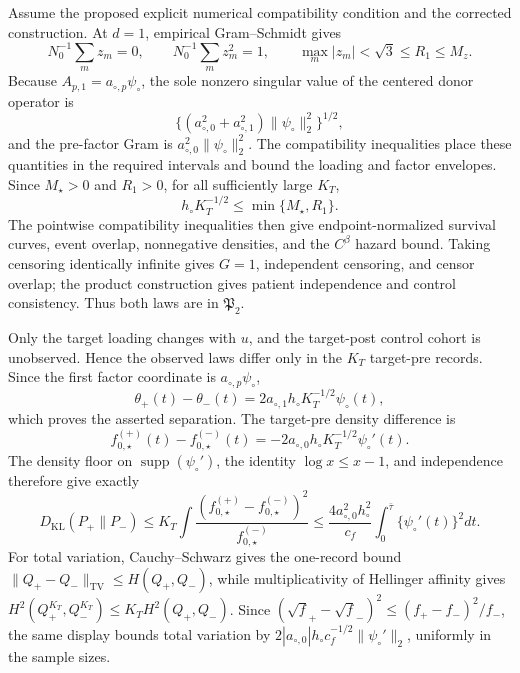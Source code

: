 Assume the proposed explicit numerical compatibility condition and the corrected construction.  At \(d=1\), empirical Gram--Schmidt gives
\[
 N_0^{-1}\sum_mz_m=0,
 \qquad N_0^{-1}\sum_mz_m^2=1,
 \qquad \max_m|z_m|<\sqrt3\le R_1\le M_z.
\]
Because \(A_{p,1}=a_{\circ,p}\psi_\circ\), the sole nonzero singular value of the centered donor operator is
\[
 \{(a_{\circ,0}^2+a_{\circ,1}^2)\|\psi_\circ\|_2^2\}^{1/2},
\]
and the pre-factor Gram is \(a_{\circ,0}^2\|\psi_\circ\|_2^2\).  The compatibility inequalities place these quantities in the required intervals and bound the loading and factor envelopes.  Since \(M_\star>0\) and \(R_1>0\), for all sufficiently large \(K_T\),
\[
 h_\circ K_T^{-1/2}\le\min\{M_\star,R_1\}.
\]
The pointwise compatibility inequalities then give endpoint-normalized survival curves, event overlap, nonnegative densities, and the \(C^\beta\) hazard bound.  Taking censoring identically infinite gives \(G=1\), independent censoring, and censor overlap; the product construction gives patient independence and control consistency.  Thus both laws are in \(\mathfrak P_2\).

Only the target loading changes with \(u\), and the target-post control cohort is unobserved.  Hence the observed laws differ only in the \(K_T\) target-pre records.  Since the first factor coordinate is \(a_{\circ,p}\psi_\circ\),
\[
 \theta_+(t)-\theta_-(t)=2a_{\circ,1}h_\circ K_T^{-1/2}\psi_\circ(t),
\]
which proves the asserted separation.  The target-pre density difference is
\[
 f_{0,\star}^{(+)}(t)-f_{0,\star}^{(-)}(t)
 =-2a_{\circ,0}h_\circ K_T^{-1/2}\psi_\circ'(t).
\]
The density floor on \(\operatorname{supp}(\psi_\circ')\), the identity \(\log x\le x-1\), and independence therefore give exactly
\[
 D_{\mathrm{KL}}(P_+\|P_-)
 \le K_T\int\frac{(f_{0,\star}^{(+)}-f_{0,\star}^{(-)})^2}{f_{0,\star}^{(-)}}
 \le\frac{4a_{\circ,0}^2h_\circ^2}{c_f}\int_0^{\bar\tau}\{\psi_\circ'(t)\}^2dt.
\]
For total variation, Cauchy--Schwarz gives the one-record bound \(\|Q_+-Q_-\|_{\mathrm{TV}}\le H(Q_+,Q_-)\), while multiplicativity of Hellinger affinity gives \(H^2(Q_+^{K_T},Q_-^{K_T})\le K_TH^2(Q_+,Q_-)\).  Since \((\sqrt f_+-\sqrt f_-)^2\le(f_+-f_-)^2/f_-\), the same display bounds total variation by \(2|a_{\circ,0}|h_\circ c_f^{-1/2}\|\psi_\circ'\|_2\), uniformly in the sample sizes.